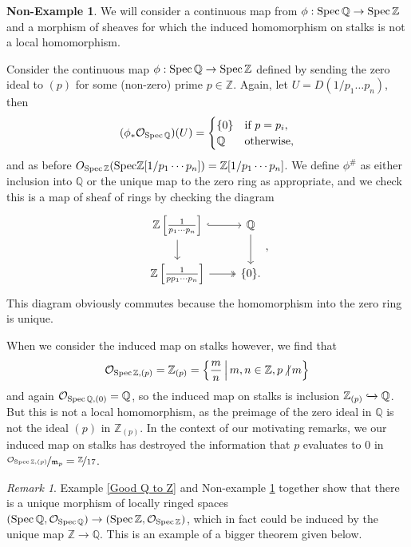 \documentclass[a4,12pt]{article}
\theoremstyle{definition}
\newtheorem{nonexample}{Non-Example}[section]
\theoremstyle{remark}
\newtheorem{remark}{Remark}[section]
\theoremstyle{plain}
\numberwithin{equation}{section}
\newcommand{\Z}{\mathbb{Z}}
\newcommand{\Q}{\mathbb{Q}}
\newcommand{\Spec}{\textnormal{Spec}\,}
\newcommand{\2}[4]{\begin{bmatrix}#1 & #2 \\ #3 & #4 \end{bmatrix}} %
\newcommand{\3}[9]{\begin{bmatrix}#1 & #2 & #3 \\ #4 & #5 & #6 \\ #7 & #8 & #9 \end{bmatrix}} %
\begin{document}
\begin{nonexample} \label{Bad Q to Z}
We will consider a continuous map from $\phi : \Spec\Q \to \Spec\Z$ and a morphism of sheaves for which the induced homomorphism on stalks is not a local homomorphism.

Consider the continuous map $\phi : \Spec\Q \to \Spec\Z$ defined by sending the zero ideal to $(p)$ for some (non-zero) prime $p \in \Z$. Again, let $U = D(1/p_1\dots p_n)$, then
\begin{equation}
(\phi_\ast\mathcal{O}_{\Spec\Q}) (U) 	= 	\begin{cases}
\{0\} 	&\text{if } p = p_i,\\
\Q &\text{otherwise},
\end{cases}
\end{equation}
and as before $O_{\Spec\Z}(\textnormal{Spec}\Z[1/p_1\cdots p_n]) = \Z[1/p_1\cdots p_n]$. We define $\phi^\#$ as either inclusion into $\Q$ or the unique map to the zero ring as appropriate, and we check this is a map of sheaf of rings by checking the diagram
\begin{equation}
\begin{tikzcd}
\Z\left[\frac{1}{p_1 \cdots p_n}\right] 	\arrow[r, hook] \arrow[d]
& \Q \arrow[d] \\
\Z\left[\frac{1}{p p_1 \cdots p_n}\right] \arrow[r, two heads] & \{0\}.
\end{tikzcd},
\end{equation}
This diagram obviously commutes because the homomorphism into the zero ring is unique. 

When we consider the induced map on stalks however, we find that
\begin{equation}
\mathcal{O}_{\Spec\Z,(p)} 
=
\Z_{(p)}
=
\left\{ \frac{m}{n} \, \Big| \, m,n \in \Z, p \!\not| \,m \right\}
\end{equation}
and again $\mathcal{O}_{\Spec\Q, (0)} = \Q$, so the induced map on stalks is inclusion $\Z_{(p)} \xhookrightarrow{} \Q$. But this is not a local homomorphism, as the preimage of the zero ideal in $\Q$ is not the ideal $(p)$ in $\Z_{(p)}$. In the context of our motivating remarks, we our induced map on stalks has destroyed the information that $p$ evaluates to 0 in $\nicefrac{\mathcal{O}_{\Spec\Z,(p)}}{\mathfrak{m}_p} = \nicefrac{\Z}{17}$.
\end{nonexample}

\begin{remark}
Example \ref{Good Q to Z} and Non-example \ref{Bad Q to Z} together show that there is a unique morphism of locally ringed spaces $(\Spec\Q, \mathcal{O}_{\Spec\Q}) \to (\Spec\Z, \mathcal{O}_{\Spec\Z})$, which in fact could be induced by the unique map $\Z \to \Q$. This is an example of a bigger theorem given below.
\end{remark}
\end{document}
